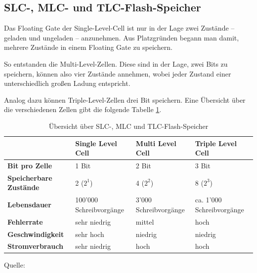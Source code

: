 \subsection{SLC-, MLC- und TLC-Flash-Speicher}
Das Floating Gate der Single-Level-Cell ist nur in der Lage zwei Zustände -- geladen und ungeladen -- anzunehmen. Aus Platzgründen begann man damit, mehrere Zustände in einem Floating Gate zu speichern.

So entstanden die Multi-Level-Zellen. Diese sind in der Lage, zwei Bits zu speichern, können also vier Zustände annehmen, wobei jeder Zustand einer unterschiedlich großen Ladung entspricht.

Analog dazu können Triple-Level-Zellen drei Bit speichern. Eine Übersicht über die verschiedenen Zellen gibt die folgende Tabelle \ref{tab:slcmlc}.

\begin{table}[h]
    \centering
    \caption{Übersicht über SLC-, MLC und TLC-Flash-Speicher}
    \begin{tabular}{p{3cm}|l|l|l}
        & \textbf{Single Level Cell} & \textbf{Multi Level Cell} & \textbf{Triple Level Cell} \\ \hline
        \textbf{Bit pro Zelle} & 1 Bit & 2 Bit & 3 Bit \\ \hline
        \textbf{Speicherbare Zustände} & 2 ($2^1$) & 4 ($2^2$) & 8 ($2^3$) \\ \hline
        \textbf{Lebensdauer} & 100'000 Schreibvorgänge & 3'000 Schreibvorgänge & ca. 1'000 Schreibvorgänge \\ \hline
        \textbf{Fehlerrate} & sehr niedrig & mittel & hoch \\ \hline
        \textbf{Geschwindigkeit} & sehr hoch & niedrig & niedrig \\ \hline
        \textbf{Stromverbrauch} & sehr niedrig & hoch & hoch \\ \hline
    \end{tabular}
    \label{tab:slcmlc}
    Quelle: \cite{flashspeicherkomp}
\end{table}